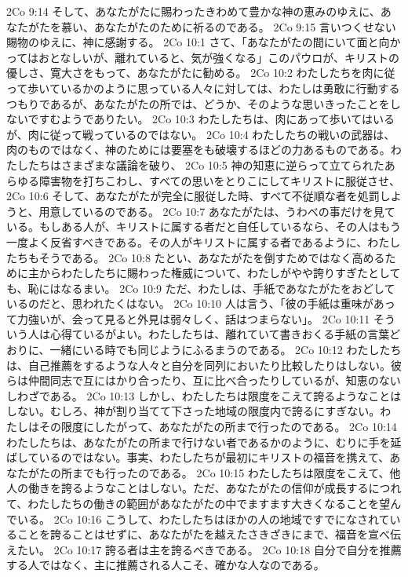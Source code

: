 2Co 9:14  そして、あなたがたに賜わったきわめて豊かな神の恵みのゆえに、あなたがたを慕い、あなたがたのために祈るのである。
2Co 9:15  言いつくせない賜物のゆえに、神に感謝する。
2Co 10:1  さて、「あなたがたの間にいて面と向かってはおとなしいが、離れていると、気が強くなる」このパウロが、キリストの優しさ、寛大さをもって、あなたがたに勧める。
2Co 10:2  わたしたちを肉に従って歩いているかのように思っている人々に対しては、わたしは勇敢に行動するつもりであるが、あなたがたの所では、どうか、そのような思いきったことをしないですむようでありたい。
2Co 10:3  わたしたちは、肉にあって歩いてはいるが、肉に従って戦っているのではない。
2Co 10:4  わたしたちの戦いの武器は、肉のものではなく、神のためには要塞をも破壊するほどの力あるものである。わたしたちはさまざまな議論を破り、
2Co 10:5  神の知恵に逆らって立てられたあらゆる障害物を打ちこわし、すべての思いをとりこにしてキリストに服従させ、
2Co 10:6  そして、あなたがたが完全に服従した時、すべて不従順な者を処罰しようと、用意しているのである。
2Co 10:7  あなたがたは、うわべの事だけを見ている。もしある人が、キリストに属する者だと自任しているなら、その人はもう一度よく反省すべきである。その人がキリストに属する者であるように、わたしたちもそうである。
2Co 10:8  たとい、あなたがたを倒すためではなく高めるために主からわたしたちに賜わった権威について、わたしがやや誇りすぎたとしても、恥にはなるまい。
2Co 10:9  ただ、わたしは、手紙であなたがたをおどしているのだと、思われたくはない。
2Co 10:10  人は言う、「彼の手紙は重味があって力強いが、会って見ると外見は弱々しく、話はつまらない」。
2Co 10:11  そういう人は心得ているがよい。わたしたちは、離れていて書きおくる手紙の言葉どおりに、一緒にいる時でも同じようにふるまうのである。
2Co 10:12  わたしたちは、自己推薦をするような人々と自分を同列においたり比較したりはしない。彼らは仲間同志で互にはかり合ったり、互に比べ合ったりしているが、知恵のないしわざである。
2Co 10:13  しかし、わたしたちは限度をこえて誇るようなことはしない。むしろ、神が割り当てて下さった地域の限度内で誇るにすぎない。わたしはその限度にしたがって、あなたがたの所まで行ったのである。
2Co 10:14  わたしたちは、あなたがたの所まで行けない者であるかのように、むりに手を延ばしているのではない。事実、わたしたちが最初にキリストの福音を携えて、あなたがたの所までも行ったのである。
2Co 10:15  わたしたちは限度をこえて、他人の働きを誇るようなことはしない。ただ、あなたがたの信仰が成長するにつれて、わたしたちの働きの範囲があなたがたの中でますます大きくなることを望んでいる。
2Co 10:16  こうして、わたしたちはほかの人の地域ですでになされていることを誇ることはせずに、あなたがたを越えたさきざきにまで、福音を宣べ伝えたい。
2Co 10:17  誇る者は主を誇るべきである。
2Co 10:18  自分で自分を推薦する人ではなく、主に推薦される人こそ、確かな人なのである。
